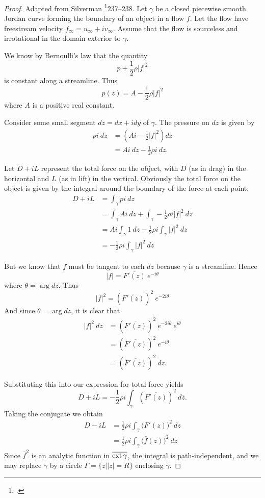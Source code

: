 \documentclass[letterpaper, twoside, 12 pt]{article}
\begin{document}
	\begin{proof}
		Adapted from Silverman \footcite{silverman}{237--238}.
		Let $\gamma$ be a closed piecewise smooth Jordan curve forming the boundary of an object in a flow $f$.
		Let the flow have freestream velocity $f_\infty = u_\infty + i v_\infty$.
		Assume that the flow is sourceless and irrotational in the domain exterior to $\gamma$.

		We know by Bernoulli's law that the quantity 
		\[
			p + \frac{1}{2} \rho |f|^2
		\]
		is constant along a streamline.
		Thus
		\[
			p(z) = A - \frac{1}{2} \rho |f|^2
		\]
		where $A$ is a positive real constant.

		Consider some small segment $dz = dx + i dy$ of $\gamma$.
		The pressure on $dz$ is given by 
		\begin{align*}
			p i \> dz &= \left(  A i - \frac{1}{2} |f|^2 \right) dz \\
			&= Ai \> dz - \frac{1}{2} \rho i \> dz.
		\end{align*}
		
		Let $D + iL$ represent the total force on the object, with $D$ (as in drag) in the horizontal and $L$ (as in lift) in the vertical.
		Obviously the total force on the object is given by the integral around the boundary of the force at each point:
		\begin{align*}
			D + iL &= \int_\gamma p i \ dz  \\
			&= \int_\gamma Ai \ dz + \int_\gamma -\frac{1}{2} \rho i |f|^2 \ dz \\
			&= Ai \int_\gamma 1 \ dz - \frac{1}{2} \rho i \int_\gamma |f|^2 \ dz \\
			&= - \frac{1}{2} \rho i \int_\gamma |f|^2 \ dz
		\end{align*}

		But we know that $f$ must be tangent to each $dz$ because $\gamma$ is a streamline.
		Hence
		\[
			|f| = \overline{F'(z)}\> e^{-i \theta}
		\]
		where $\theta = \arg dz$.
		Thus
		\[
			|f|^2 = \left( \overline{F'(z)} \right)^2 \> e^{-2i \theta}
		\]
		And since $\theta = \arg dz$, it is clear that 
		\begin{align*}
			|f|^2 \ dz &= \left( \overline{F'(z)} \right)^2 \> e^{-2i \theta} \> e^{i \theta} \\
			&= \left( \overline{F'(z)} \right)^2 \> e^{-i \theta} \\
			&= \left( \overline{F'(z)} \right)^2 \ d \bar z.
		\end{align*}
		
		
		Substituting this into our expression for total force yields
		\[
			D + iL = - \frac{1}{2} \rho i \int_\gamma \left( \overline{F'(z)} \right)^2 \ d \bar z.
		\]
		Taking the conjugate we obtain
		\begin{align*}
			D - iL &= \frac{1}{2} \rho i \int_\gamma \big( F'(z) \big)^2 \ dz \\
			&= \frac{1}{2} \rho i \int_\gamma \big( \bar f(z) \big)^2 \ dz  
		\end{align*}
		Since $\bar f^2$ is an analytic function in $\overline{\operatorname*{ext} \gamma}$, the integral is path-independent, and we may replace $\gamma$ by a circle $\Gamma = \{ z \bm{\mid} |z| = R \}$ enclosing $\gamma$.


\end{proof}
\end{document}
